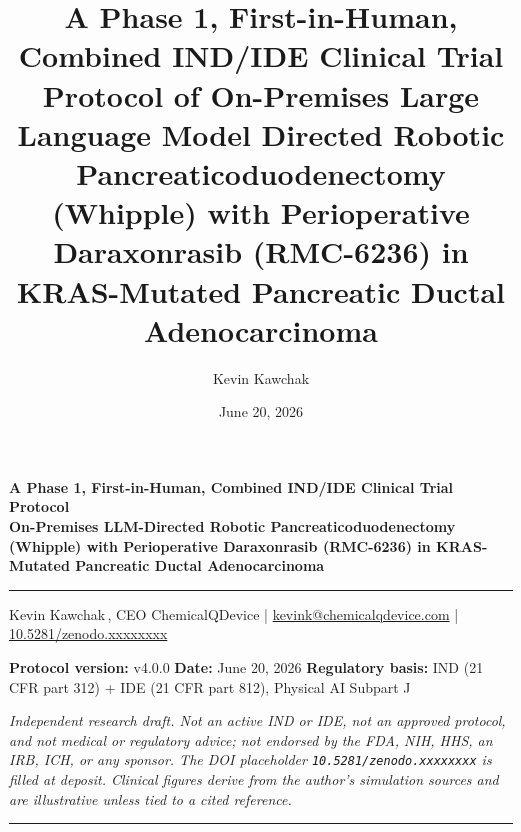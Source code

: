 \documentclass[11pt]{article}
\title{A Phase 1, First-in-Human, Combined IND/IDE Clinical Trial Protocol of
On-Premises Large Language Model Directed Robotic Pancreaticoduodenectomy
(Whipple) with Perioperative Daraxonrasib (RMC-6236) in KRAS-Mutated Pancreatic
Ductal Adenocarcinoma}
\author{Kevin Kawchak}
\date{June 20, 2026}
\begin{document}
\thispagestyle{plain}

\begin{center}
{\LARGE\bfseries\color{accentcol} A Phase 1, First-in-Human, Combined IND/IDE
Clinical Trial Protocol}\\[0.4em]
{\large\bfseries On-Premises LLM-Directed Robotic Pancreaticoduodenectomy
(Whipple) with Perioperative Daraxonrasib (RMC-6236) in KRAS-Mutated Pancreatic
Ductal Adenocarcinoma}\\[0.3em]
{\color{accentcol}\rule{\linewidth}{1.2pt}}
\end{center}

\begin{center}\small
Kevin Kawchak\,, CEO ChemicalQDevice \;|\;
\href{mailto:kevink@chemicalqdevice.com}{kevink@chemicalqdevice.com} \;|\;
\href{https://doi.org/10.5281/zenodo.xxxxxxxx}{10.5281/zenodo.xxxxxxxx}
\end{center}

\begin{center}\footnotesize
\textbf{Protocol version:} v4.0.0 \quad
\textbf{Date:} June 20, 2026 \quad
\textbf{Regulatory basis:} IND (21 CFR part 312) + IDE (21 CFR part 812),
Physical AI Subpart J
\end{center}

\noindent\footnotesize\textit{Independent research draft. Not an active IND or
IDE, not an approved protocol, and not medical or regulatory advice; not endorsed
by the FDA, NIH, HHS, an IRB, ICH, or any sponsor. The DOI placeholder
\texttt{10.5281/zenodo.xxxxxxxx} is filled at deposit. Clinical figures derive
from the author's simulation sources and are illustrative unless tied to a cited
reference.}\normalsize\par

\renewcommand{\keywordname}{\textbf{Keywords}}

\vspace{0.4em}
{\color{accentcol}\rule{\linewidth}{0.6pt}}

\renewcommand{\contentsname}{\color{accentcol}Table of Contents}
{\setlength{\parskip}{0pt}\small\tableofcontents}
\clearpage














\end{document}
